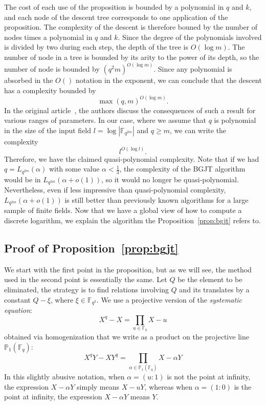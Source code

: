 \documentclass[a4paper,11pt]{article}
\theoremstyle{break}
\theoremstyle{sc}
\theoremstyle{definition}
\theoremstyle{remark}
\begin{document}
The cost of each use of the proposition is bounded by a polynomial in $q$ and
$k$, and each node of the descent tree corresponds to one application of the
proposition. The complexity of the descent is therefore bouned by the number of
nodes times a polynomial in $q$ and $k$. Since the degree of the polynomials
involved is divided by two during each step, the depth of the tree is
$O(\log m)$. The number of node in a tree is bounded by its arity to the power
of its depth, so the number of node is bounded by $(q^2m)^{O(\log m)}$. Since
any polynomial is absorbed in the $O()$ notation in the exponent, we can
conclude that the descent has a complexity bounded by
\[
  \max(q, m)^{O(\log m)}.
\]
In the original article~\cite{BGJT13}, the authors discuss the consequences of
such a result for various ranges of parameters. In our case, where we assume
that $q$ is polynomial in the size of the input field $l=\log|\mathbb{F}_{q^{2m}}|$ and
$q\geq m$, we can write the complexity
\[
  l^{O(\log l)}.
\]
Therefore, we have the claimed quasi-polynomial complexity. Note that if we had
$q = L_{q^{2m}}(\alpha)$ with some value $\alpha<\frac{1}{3}$, the complexity of the BGJT
algorithm would be in
$L_{q^{2m}}(\alpha+o(1))$, so it would no longer be quasi-polynomial. Nevertheless, even if
less impressive than quasi-polynomial complexity, $L_{q^{2m}}(\alpha+o(1))$ is
still better than previously known algorithms for a large sample of finite
fields. Now that we have a global view of how to compute a discrete logarithm,
we explain the algorithm the Proposition~\ref{prop:bgjt} refers to.

\subsection{Proof of Proposition~\ref{prop:bgjt}}

We start with the first point in the proposition, but as we will see, the method
used in the second point is essentially the same. Let $Q$ be the element to
be eliminated, the strategy is to find relations involving $Q$ and its
translates by a constant $Q-\xi$, where $\xi\in\mathbb{F}_{q^2}$. We use a
projective version of the
\emph{systematic equation}:
\[
  X^q - X = \prod_{u\in\mathbb{F}_q} X-u 
\]
obtained via homogenization that we write as a product on the projective
line $\mathbb{P}_1(\mathbb{F}_q)$:
  \begin{equation} 
  X^qY-XY^q = \prod_{\alpha\in\mathbb{P}_1(\mathbb{F}_q)} X - \alpha Y
    \label{proj-eq}
  \end{equation}
In this slightly abusive notation, when $\alpha=(u:1)$ is not the point at
infinity, the expression $X-\alpha Y$ simply means $X-uY$, whereas when
$\alpha=(1:0)$ is the point at infinity, the expression $X-\alpha Y$ means $Y$.
\end{document}
